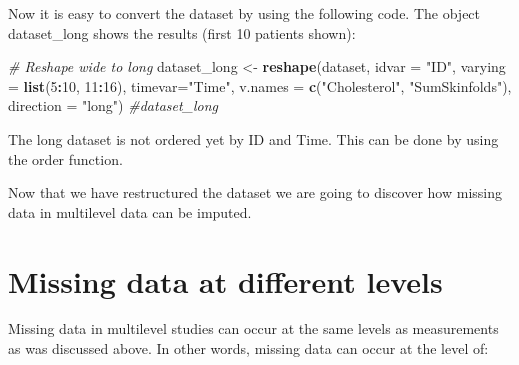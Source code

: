 \documentclass[]{book}
\newenvironment{Shaded}{\begin{snugshade}}{\end{snugshade}}
\newcommand{\KeywordTok}[1]{\textcolor[rgb]{0.13,0.29,0.53}{\textbf{#1}}}
\newcommand{\DataTypeTok}[1]{\textcolor[rgb]{0.13,0.29,0.53}{#1}}
\newcommand{\DecValTok}[1]{\textcolor[rgb]{0.00,0.00,0.81}{#1}}
\newcommand{\StringTok}[1]{\textcolor[rgb]{0.31,0.60,0.02}{#1}}
\newcommand{\CommentTok}[1]{\textcolor[rgb]{0.56,0.35,0.01}{\textit{#1}}}
\newcommand{\OperatorTok}[1]{\textcolor[rgb]{0.81,0.36,0.00}{\textbf{#1}}}
\newcommand{\NormalTok}[1]{#1}
\begin{document}
Now it is easy to convert the dataset by using the following code. The
object dataset\_long shows the results (first 10 patients shown):

\begin{Shaded}
\begin{Highlighting}[]
\CommentTok{# Reshape wide to long}
\NormalTok{dataset_long <-}\StringTok{ }\KeywordTok{reshape}\NormalTok{(dataset, }\DataTypeTok{idvar =} \StringTok{"ID"}\NormalTok{, }\DataTypeTok{varying =} \KeywordTok{list}\NormalTok{(}\DecValTok{5}\OperatorTok{:}\DecValTok{10}\NormalTok{, }\DecValTok{11}\OperatorTok{:}\DecValTok{16}\NormalTok{), }\DataTypeTok{timevar=}\StringTok{"Time"}\NormalTok{, }
         \DataTypeTok{v.names =} \KeywordTok{c}\NormalTok{(}\StringTok{"Cholesterol"}\NormalTok{, }\StringTok{"SumSkinfolds"}\NormalTok{), }\DataTypeTok{direction =} \StringTok{"long"}\NormalTok{)}
\CommentTok{#dataset_long}
\end{Highlighting}
\end{Shaded}

The long dataset is not ordered yet by ID and Time. This can be done by
using the order function.

\begin{Shaded}
\end{Shaded}

Now that we have restructured the dataset we are going to discover how
missing data in multilevel data can be imputed.

\section{Missing data at different
levels}\label{missing-data-at-different-levels}

Missing data in multilevel studies can occur at the same levels as
measurements as was discussed above. In other words, missing data can
occur at the level of:
\end{document}

